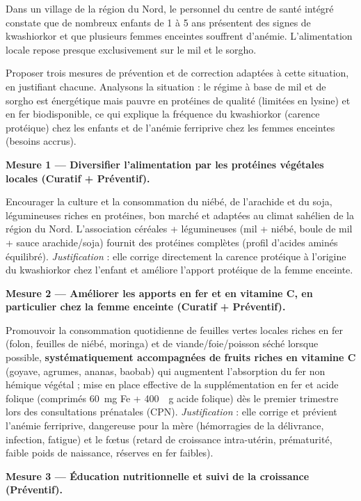 \documentclass[11pt]{article}
\newcommand{\cle}[1]{{\popxbold\color{popdark}#1}}
\begin{document}
\begin{exoresolu}
Dans un village de la région du Nord, le personnel du centre de santé intégré constate que de nombreux enfants de 1 à 5 ans présentent des signes de kwashiorkor et que plusieurs femmes enceintes souffrent d'anémie. L'alimentation locale repose presque exclusivement sur le mil et le sorgho.

Proposer trois mesures de prévention et de correction adaptées à cette situation, en justifiant chacune.
\tcblower
Analysons la situation : le régime à base de mil et de sorgho est énergétique mais pauvre en protéines de qualité (limitées en lysine) et en fer biodisponible, ce qui explique la fréquence du kwashiorkor (carence protéique) chez les enfants et de l'anémie ferriprive chez les femmes enceintes (besoins accrus).

\textbf{Mesure 1 — Diversifier l'alimentation par les protéines végétales locales (Curatif + Préventif).}

Encourager la culture et la consommation du \cle{niébé}, de l'\cle{arachide} et du \cle{soja}, légumineuses riches en protéines, bon marché et adaptées au climat sahélien de la région du Nord. L'association céréales + légumineuses (mil + niébé, boule de mil + sauce arachide/soja) fournit des protéines complètes (profil d'acides aminés équilibré). \emph{Justification} : elle corrige directement la carence protéique à l'origine du kwashiorkor chez l'enfant et améliore l'apport protéique de la femme enceinte.

\textbf{Mesure 2 — Améliorer les apports en fer et en vitamine C, en particulier chez la femme enceinte (Curatif + Préventif).}

Promouvoir la consommation quotidienne de feuilles vertes locales riches en fer (folon, feuilles de niébé, moringa) et de viande/foie/poisson séché lorsque possible, \textbf{systématiquement accompagnées de fruits riches en vitamine C} (goyave, agrumes, ananas, baobab) qui augmentent l'absorption du fer non hémique végétal ; mise en place effective de la \cle{supplémentation en fer et acide folique} (comprimés \SI{60}{mg} Fe + \SI{400}{\mu g} acide folique) dès le premier trimestre lors des consultations prénatales (CPN). \emph{Justification} : elle corrige et prévient l'anémie ferriprive, dangereuse pour la mère (hémorragies de la délivrance, infection, fatigue) et le fœtus (retard de croissance intra-utérin, prématurité, faible poids de naissance, réserves en fer faibles).

\textbf{Mesure 3 — Éducation nutritionnelle et suivi de la croissance (Préventif).}


\end{exoresolu}
\end{document}
